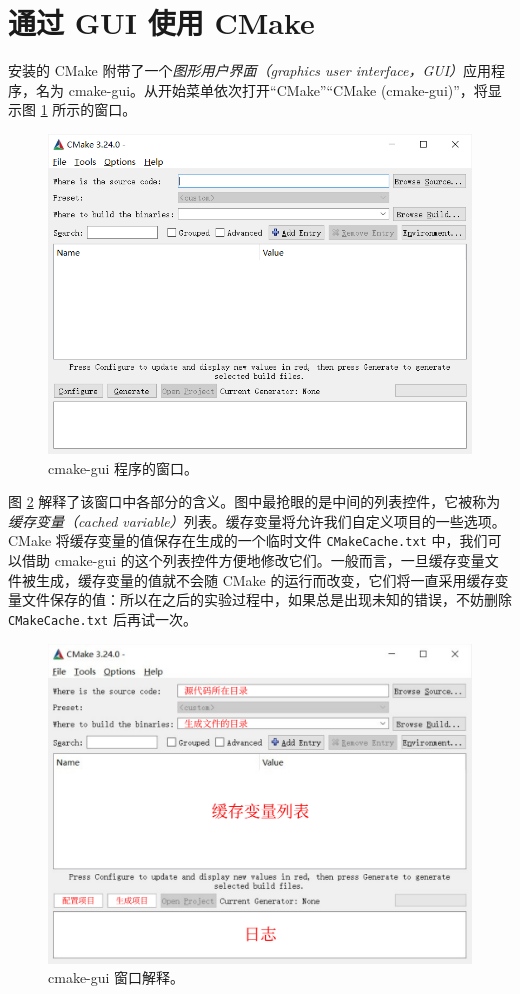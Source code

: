
\section{通过 GUI 使用 CMake}

安装的 CMake 附带了一个\emph{图形用户界面（graphics user interface，GUI）}应用程序，名为 cmake-gui。从开始菜单依次打开“CMake”“CMake (cmake-gui)”，将显示图 \ref{fig:cmake-gui-1} 所示的窗口。

\begin{figure}
	\centering
	\includegraphics[width=0.75\linewidth]{assets/cmake-gui-1}
	\caption{cmake-gui 程序的窗口。}
	\label{fig:cmake-gui-1}
\end{figure}

图 \ref{fig:cmake-gui-2} 解释了该窗口中各部分的含义。图中最抢眼的是中间的列表控件，它被称为\emph{缓存变量（cached variable）}列表。缓存变量将允许我们自定义项目的一些选项。CMake 将缓存变量的值保存在生成的一个临时文件 \lstinline[language={}]{CMakeCache.txt} 中，我们可以借助 cmake-gui 的这个列表控件方便地修改它们。一般而言，一旦缓存变量文件被生成，缓存变量的值就不会随 CMake 的运行而改变，它们将一直采用缓存变量文件保存的值：所以在之后的实验过程中，如果总是出现未知的错误，不妨删除 \lstinline[language={}]{CMakeCache.txt} 后再试一次。

\begin{figure}
	\centering
	\includegraphics[width=0.75\linewidth]{assets/cmake-gui-2}
	\caption{cmake-gui 窗口解释。}
	\label{fig:cmake-gui-2}
\end{figure}

